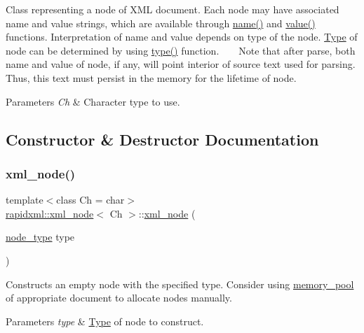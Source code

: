 Class representing a node of X\+ML document. Each node may have associated name and value strings, which are available through \mbox{\hyperlink{classrapidxml_1_1xml__base_aef8ae147fbee59209f714274afc80dc4}{name()}} and \mbox{\hyperlink{classrapidxml_1_1xml__base_a6af65de5e59ac497cd69838f8a89d602}{value()}} functions. Interpretation of name and value depends on type of the node. \mbox{\hyperlink{class_type}{Type}} of node can be determined by using \mbox{\hyperlink{classrapidxml_1_1xml__node_a5f91729128856b0aaab598d4364ace60}{type()}} function. ~\newline
~\newline
 Note that after parse, both name and value of node, if any, will point interior of source text used for parsing. Thus, this text must persist in the memory for the lifetime of node. 
\begin{DoxyParams}{Parameters}
{\em Ch} & Character type to use. \\
\hline
\end{DoxyParams}


\subsection{Constructor \& Destructor Documentation}
\mbox{\label{classrapidxml_1_1xml__node_a8bd9019960b90605a45998b661fb1b0e}} 
\subsubsection{\texorpdfstring{xml\+\_\+node()}{xml\_node()}\hspace{0.1cm}{\footnotesize\ttfamily [1/2]}}
{\footnotesize\ttfamily template$<$class Ch = char$>$ \\
\mbox{\hyperlink{classrapidxml_1_1xml__node}{rapidxml\+::xml\+\_\+node}}$<$ Ch $>$\+::\mbox{\hyperlink{classrapidxml_1_1xml__node}{xml\+\_\+node}} (\begin{DoxyParamCaption}\item[{\mbox{\hyperlink{namespacerapidxml_abb456db38f7efb746c4330eed6072a7c}{node\+\_\+type}}}]{type }\end{DoxyParamCaption})\hspace{0.3cm}{\ttfamily [inline]}}

Constructs an empty node with the specified type. Consider using \mbox{\hyperlink{classrapidxml_1_1memory__pool}{memory\+\_\+pool}} of appropriate document to allocate nodes manually. 
\begin{DoxyParams}{Parameters}
{\em type} & \mbox{\hyperlink{class_type}{Type}} of node to construct. \\
\hline
\end{DoxyParams}
\mbox{\label{classrapidxml_1_1xml__node_a8bd9019960b90605a45998b661fb1b0e}} 
